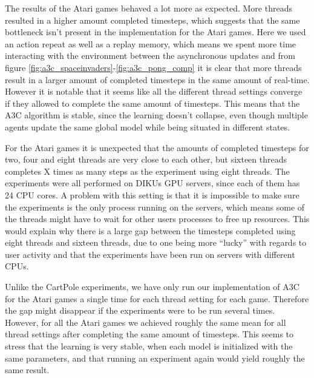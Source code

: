 \documentclass[11pt]{article}
\begin{document}
The results of the Atari games behaved a lot more as expected.
More threads resulted in a higher amount completed timesteps,
which suggests that the same bottleneck isn't present in
the implementation for the Atari games.
Here we used an action repeat as well as a replay memory,
which means we spent more time interacting with the environment
between the asynchronous updates and from figure \ref{fig:a3c_spaceinvaders}-\ref{fig:a3c_pong_comp}
it is clear that more threads result in a larger amount of completed timesteps
in the same amount of real-time.
However it is notable that it seems like all the different thread
settings converge if they allowed to complete the same amount of timesteps.
This means that the A3C algorithm is stable, since the learning
doesn't collapse, even though multiple agents update the same global model
while being situated in different states.


For the Atari games it is unexpected that the amounts of completed timesteps
for two, four and eight threads are very close to each other, but
sixteen threads completes X times as many steps as the experiment using eight
threads.
The experiments were all performed on DIKUs GPU servers, since each of them
has 24 CPU cores.
A problem with this setting is that it is impossible to make sure
the experiments is the only process running on the servers, which means
some of the threads might have to wait for other users processes to
free up resources.
This would explain why there is a large gap between the timesteps
completed using eight threads and sixteen threads, due to one
being more “lucky” with regards to user activity and
that the experiments have been run on servers with different CPUs.

Unlike the CartPole experiments, we have only run our implementation
of A3C for the Atari games a single time for each thread setting for each game.
Therefore the gap might disappear if the experiments were to be run
several times.
However, for all the Atari games we achieved roughly the same mean
for all thread settings after completing the same amount of timesteps.
This seems to stress that the learning is very stable, when each model is initialized
with the same parameters, and that running an experiment again would yield
roughly the same result.
\end{document}
